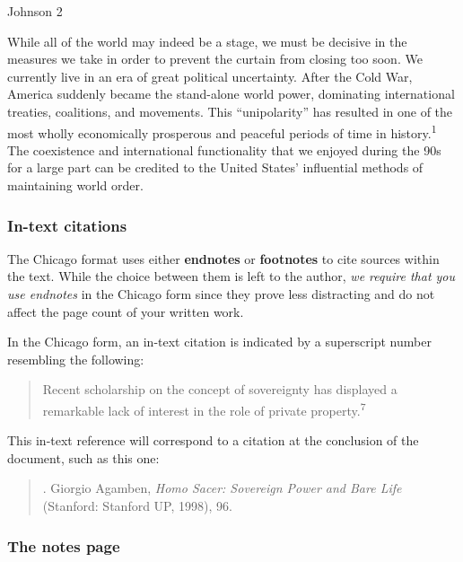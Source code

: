 

\thispagestyle{empty}
\begin{flushright}Johnson 2\end{flushright}
\bigskip
\begin{doublespace}

\tab While all of the world may indeed be a stage, we must be decisive in the measures we take in order to prevent the curtain from closing too soon. We currently live in an era of great political uncertainty. After the Cold War, America suddenly became the stand-alone world power, dominating international treaties, coalitions, and movements. This ``unipolarity'' has resulted in one of the most wholly economically prosperous and peaceful periods of time in history.\textsuperscript{1} The coexistence and international functionality that we enjoyed during the 90s for a large part can be credited to the United States' influential methods of maintaining world order.
\end{doublespace}
\newpage



\subsubsection {In-text citations}
The Chicago format uses either \textbf{endnotes} or \textbf{footnotes} to cite sources within the text. While the choice between them is left to the author, \emph{we require that you use endnotes} in the Chicago form since they prove less distracting and do not affect the page count of your written work. 

In the Chicago form, an in-text citation is indicated by a superscript number resembling the following:

\begin{quote}
Recent scholarship on the concept of sovereignty has displayed a remarkable lack of interest in the role of private property.\textsuperscript{7}
\end{quote}
This in-text reference will correspond to a citation at the conclusion of the document, such as this one:

\begin{quote}
. Giorgio Agamben, \emph{Homo Sacer: Sovereign Power and Bare Life} (Stanford: Stanford UP, 1998), 96.
\end{quote}


\subsubsection{The notes page}






